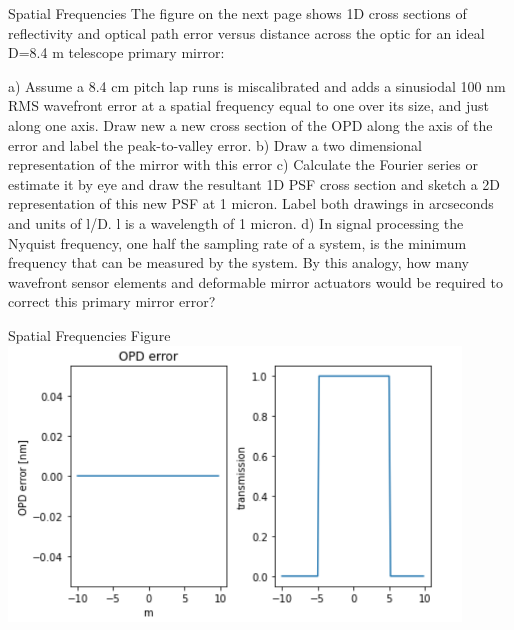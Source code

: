\begin{frame}{Spatial Frequencies}
The figure on the next page shows 1D cross sections of reflectivity and optical path error versus distance across the optic for an ideal D=8.4 m telescope primary mirror:

a)	Assume a 8.4 cm pitch lap runs is miscalibrated and adds a sinusiodal 100 nm RMS wavefront error at a spatial frequency equal to one over its size, and just along one axis. Draw new a new cross section of the OPD along the axis of the error and label the peak-to-valley error.
b)	Draw a two dimensional representation of the mirror with this error
c)	Calculate the Fourier series or estimate it by eye and draw the resultant 1D PSF cross section and sketch a 2D representation of this new PSF at 1 micron. Label both drawings in arcseconds and units of l/D. l is a wavelength of 1 micron.
d)	In signal processing the Nyquist frequency, one half the sampling rate of a system, is the minimum frequency that can be measured by the system. By this analogy, how many wavefront sensor elements and deformable mirror actuators would be required to correct this primary mirror error?
\end{frame}
\begin{frame}{Spatial Frequencies Figure}
\includegraphics[width=0.9\textwidth]{figs/OPD_trans.png}
\end{frame}